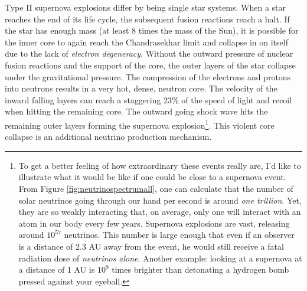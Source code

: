 Type II supernova explosions differ by being single star systems. When a star reaches the end of its life cycle, the subsequent fusion reactions reach a halt. If the star has enough mass (at least 8 times the mass of the Sun), it is possible for the inner core to again reach the Chandrasekhar limit and collapse in on itself due to the lack of \textit{electron degeneracy}. Without the outward pressure of nuclear fusion reactions and the support of the core, the outer layers of the star collapse under the gravitational pressure. The compression of the electrons and protons into neutrons results in a very hot, dense, neutron core. The velocity of the inward falling layers can reach a staggering 23\% of the speed of light and recoil when hitting the remaining core. The outward going shock wave hits the remaining outer layers forming the supernova explosion\footnote{To get a better feeling of how extraordinary these events really are, I'd like to illustrate what it would be like if one could be close to a supernova event. From Figure \ref{fig:neutrinospectrumall}, one can calculate that the number of solar neutrinos going through our hand per second is around \textit{one trillion}. Yet, they are so weakly interacting that, on average, only one will interact with an atom in our body every few years. Supernova explosions are vast, releasing around $10^{57}$ neutrinos. This number is large enough that even if an observer is a distance of 2.3 AU away from the event, he would still receive a fatal radiation dose of \textit{neutrinos alone}. Another example: looking at a supernova at a distance of 1 AU is $10^9$ times brighter than detonating a hydrogen bomb pressed against your eyeball.}. This violent core collapse is an additional neutrino production mechanism.

